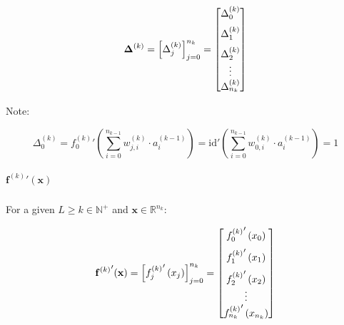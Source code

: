 \documentclass{article}
\begin{document}
            \begin{equation}
              \mathbf{\Delta}^{(k)}
                = \left[ \Delta_j^{(k)} \right]_{j=0}^{n_k}
                = \begin{bmatrix}
                    \vspace{1.5ex}
                    \Delta_0^{(k)} \\
                    \vspace{1.5ex}
                    \Delta_1^{(k)} \\
                    \Delta_2^{(k)} \\
                    \vdots \\
                    \Delta_{n_k}^{(k)}
                  \end{bmatrix}
            \end{equation}

            Note:

            \begin{equation}
              \Delta_0^{(k)}
                = {f_0^{(k)}}' \left(
                    \sum_{i=0}^{n_{k-1}} w_{j,i}^{(k)} \cdot a_i^{(k-1)}
                  \right)
                = {\text{id}}' \left(
                    \sum_{i=0}^{n_{k-1}} w_{0,i}^{(k)} \cdot a_i^{(k-1)}
                  \right)
                = 1
            \end{equation}

          \subparagraph{${\mathbf{f}^{(k)}}'(\mathbf{x})$}

            For a given $L \geq k \in \mathbb{N}^+$ and
            $\mathbf{x} \in \mathbb{R}^{n_k}$:

              \begin{equation}
                {\mathbf{f}^{(k)}}'(\mathbf{x})
                  = \left[ {f_j^{(k)}}' \left( x_j \right) \right]_{j=0}^{n_k}
                  = \begin{bmatrix}
                      \vspace{1.5ex}
                      {f_0^{(k)}}' \left( x_0 \right) \\
                      \vspace{1.5ex}
                      {f_1^{(k)}}' \left( x_1 \right) \\
                      {f_2^{(k)}}' \left( x_2 \right) \\
                      \vdots \\
                      {f_{n_k}^{(k)}}' \left( x_{n_k} \right)
                    \end{bmatrix}
              \end{equation}
\end{document}
